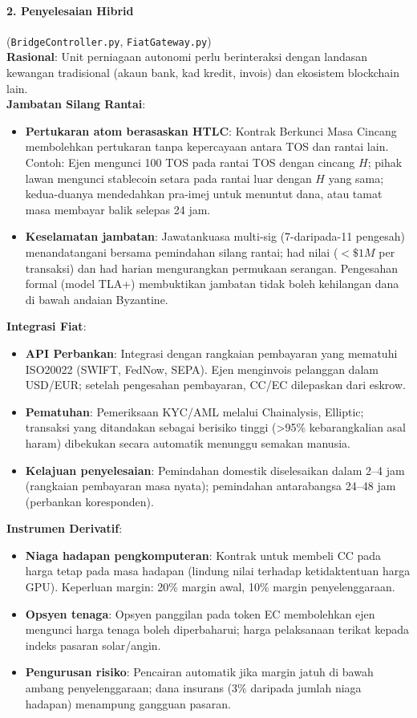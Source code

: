 \documentclass[11pt]{article}
\begin{document}
\paragraph{2. Penyelesaian Hibrid} (\texttt{BridgeController.py}, \texttt{FiatGateway.py})\\
\textbf{Rasional}: Unit perniagaan autonomi perlu berinteraksi dengan landasan kewangan tradisional (akaun bank, kad kredit, invois) dan ekosistem blockchain lain.\\
\textbf{Jambatan Silang Rantai}:
\begin{itemize}[noitemsep]
  \item \textbf{Pertukaran atom berasaskan HTLC}: Kontrak Berkunci Masa Cincang membolehkan pertukaran tanpa kepercayaan antara TOS dan rantai lain. Contoh: Ejen mengunci 100 TOS pada rantai TOS dengan cincang $H$; pihak lawan mengunci stablecoin setara pada rantai luar dengan $H$ yang sama; kedua-duanya mendedahkan pra-imej untuk menuntut dana, atau tamat masa membayar balik selepas 24 jam.
  \item \textbf{Keselamatan jambatan}: Jawatankuasa multi-sig (7-daripada-11 pengesah) menandatangani bersama pemindahan silang rantai; had nilai ($<\$1M$ per transaksi) dan had harian mengurangkan permukaan serangan. Pengesahan formal (model TLA+) membuktikan jambatan tidak boleh kehilangan dana di bawah andaian Byzantine.
\end{itemize}
\textbf{Integrasi Fiat}:
\begin{itemize}[noitemsep]
  \item \textbf{API Perbankan}: Integrasi dengan rangkaian pembayaran yang mematuhi ISO20022 (SWIFT, FedNow, SEPA). Ejen menginvois pelanggan dalam USD/EUR; setelah pengesahan pembayaran, CC/EC dilepaskan dari eskrow.
  \item \textbf{Pematuhan}: Pemeriksaan KYC/AML melalui Chainalysis, Elliptic; transaksi yang ditandakan sebagai berisiko tinggi (>95\% kebarangkalian asal haram) dibekukan secara automatik menunggu semakan manusia.
  \item \textbf{Kelajuan penyelesaian}: Pemindahan domestik diselesaikan dalam 2--4 jam (rangkaian pembayaran masa nyata); pemindahan antarabangsa 24--48 jam (perbankan koresponden).
\end{itemize}
\textbf{Instrumen Derivatif}:
\begin{itemize}[noitemsep]
  \item \textbf{Niaga hadapan pengkomputeran}: Kontrak untuk membeli CC pada harga tetap pada masa hadapan (lindung nilai terhadap ketidaktentuan harga GPU). Keperluan margin: 20\% margin awal, 10\% margin penyelenggaraan.
  \item \textbf{Opsyen tenaga}: Opsyen panggilan pada token EC membolehkan ejen mengunci harga tenaga boleh diperbaharui; harga pelaksanaan terikat kepada indeks pasaran solar/angin.
  \item \textbf{Pengurusan risiko}: Pencairan automatik jika margin jatuh di bawah ambang penyelenggaraan; dana insurans (3\% daripada jumlah niaga hadapan) menampung gangguan pasaran.
\end{itemize}
\end{document}
